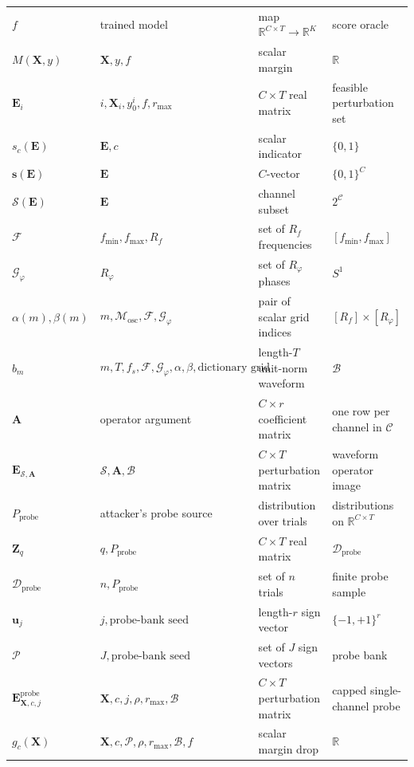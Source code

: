 \documentclass[11pt]{article}
\begin{document}
\begin{longtable}{@{}>{\raggedright\arraybackslash}p{}
>{\raggedright\arraybackslash}p{}
>{\raggedright\arraybackslash}p{}
>{\raggedright\arraybackslash}p{}@{}}
$f$ & trained model & map $\mathbb{R}^{C\times T}\to\mathbb{R}^K$ & score oracle \\
$M(\mathbf{X},y)$ & $\mathbf{X},y,f$ & scalar margin & $\mathbb{R}$ \\
$\mathbf{E}_i$ & $i,\mathbf{X}_i,y_0^i,f,r_{\max}$ & $C\times T$ real matrix & feasible perturbation set \\
$s_c(\mathbf{E})$ & $\mathbf{E},c$ & scalar indicator & $\{0,1\}$ \\
$\mathbf{s}(\mathbf{E})$ & $\mathbf{E}$ & $C$-vector & $\{0,1\}^{C}$ \\
$\mathcal{S}(\mathbf{E})$ & $\mathbf{E}$ & channel subset & $2^{\mathcal{C}}$ \\
$\mathcal{F}$ & $f_{\min},f_{\max},R_f$ & set of $R_f$ frequencies & $[f_{\min},f_{\max}]$ \\
$\mathcal{G}_{\varphi}$ & $R_\varphi$ & set of $R_\varphi$ phases & $S^1$ \\
$\alpha(m),\beta(m)$ & $m,\mathcal{M}_{\mathrm{osc}},\mathcal{F},\mathcal{G}_{\varphi}$ & pair of scalar grid indices & $[R_f]\times[R_\varphi]$ \\
$b_m$ & $m,T,f_s,\mathcal{F},\mathcal{G}_{\varphi},\alpha,\beta,\text{dictionary grid}$ & length-$T$ unit-norm waveform & $\mathcal{B}$ \\
$\mathbf{A}$ & operator argument & $C\times r$ coefficient matrix & one row per channel in $\mathcal{C}$ \\
$\mathbf{E}_{\mathcal{S},\mathbf{A}}$ & $\mathcal{S},\mathbf{A},\mathcal{B}$ & $C\times T$ perturbation matrix & waveform operator image \\
$P_{\mathrm{probe}}$ & attacker's probe source & distribution over trials & distributions on $\mathbb{R}^{C\times T}$ \\
$\mathbf{Z}_q$ & $q,P_{\mathrm{probe}}$ & $C\times T$ real matrix & $\mathcal{D}_{\mathrm{probe}}$ \\
$\mathcal{D}_{\mathrm{probe}}$ & $n,P_{\mathrm{probe}}$ & set of $n$ trials & finite probe sample \\
$\mathbf{u}_j$ & $j,\text{probe-bank seed}$ & length-$r$ sign vector & $\{-1,+1\}^{r}$ \\
$\mathcal{P}$ & $J,\text{probe-bank seed}$ & set of $J$ sign vectors & probe bank \\
$\mathbf{E}^{\mathrm{probe}}_{\mathbf{X},c,j}$ & $\mathbf{X},c,j,\rho,r_{\max},\mathcal{B}$ & $C\times T$ perturbation matrix & capped single-channel probe \\
$g_c(\mathbf{X})$ & $\mathbf{X},c,\mathcal{P},\rho,r_{\max},\mathcal{B},f$ & scalar margin drop & $\mathbb{R}$ \\

\end{longtable}
\end{document}

